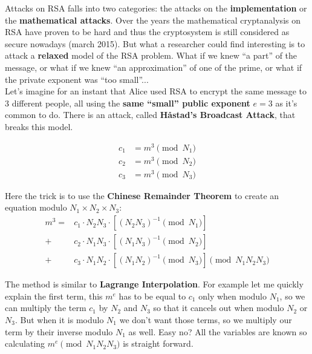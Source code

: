 \documentclass[a4paper,11pt]{article}
\begin{document}
Attacks on RSA falls into two categories: the attacks on the \textbf{implementation} or the \textbf{mathematical attacks}. Over the years the mathematical cryptanalysis on RSA have proven to be hard and thus the cryptosystem is still considered as secure nowadays (march 2015). But what a researcher could find interesting is to attack a \textbf{relaxed} model of the RSA problem. What if we knew ``a part'' of the message, or what if we knew ``an approximation'' of one of the prime, or what if the private exponent was ``too small''...\\

Let's imagine for an instant that Alice used RSA to encrypt the same message to 3 different people, all using the \textbf{same ``small'' public exponent} $e = 3$ as it's common to do. There is an attack, called \textbf{Håstad's Broadcast Attack}, that breaks this model.\\

\begin{center}
\end{center}

\begin{align*}
	c_1 &= m^3 \pmod{N_1}\\
	c_2 &= m^3 \pmod{N_2}\\
	c_3 &= m^3 \pmod{N_3}
\end{align*}

Here the trick is to use the \textbf{Chinese Remainder Theorem} to create an equation modulo $N_1 \times N_2 \times N_3$:
\begin{align*}
	m^3 = &c_1 \cdot N_2 N_3 \cdot [(N_2 N_3)^{-1} \pmod{N_1}] \\
			 + &c_2 \cdot N_1 N_3 \cdot [(N_1 N_3)^{-1} \pmod{N_2}] \\
			 + &c_3 \cdot N_1 N_2 \cdot [(N_1 N_2)^{-1} \pmod{N_3}] 
			 \pmod{N_1 N_2 N_3}
\end{align*}

The method is similar to \textbf{Lagrange Interpolation}. For example let me quickly explain the first term, this $m^e$ has to be equal to $c_1$ only when modulo $N_1$, so we can multiply the term $c_1$ by $N_2$ and $N_3$ so that it cancels out when modulo $N_2$ or $N_3$. But when it is modulo $N_1$ we don't want those terms, so we multiply our term by their inverse modulo $N_1$ as well. Easy no? All the variables are known so calculating $m^e \pmod{N_1 N_2 N_3}$ is straight forward.
\end{document}
